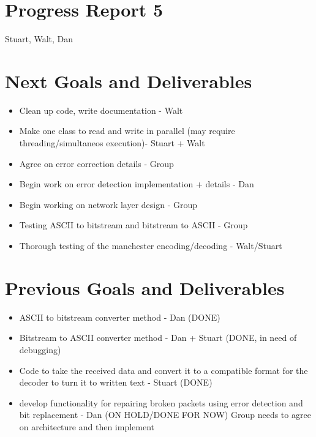 \documentclass{article}
\begin{document}
\section*{Progress Report 5}
Stuart, Walt, Dan

\section*{Next Goals and Deliverables}
\begin{itemize}
\item Clean up code, write documentation - Walt
\item Make one class to read and write in parallel (may require threading/simultaneos execution)- Stuart + Walt
\item Agree on error correction details - Group
\item Begin work on error detection implementation + details - Dan
\item Begin working on network layer design - Group
\item Testing ASCII to bitstream and bitstream to ASCII - Group
\item Thorough testing of the manchester encoding/decoding - Walt/Stuart
\end{itemize}

\section*{Previous Goals and Deliverables}
\begin{itemize}
    \item ASCII to bitstream converter method - Dan (DONE)
    \item Bitstream to ASCII converter method - Dan + Stuart (DONE, in need of debugging)
    \item Code to take the received data and convert it to a compatible format for the decoder to turn it to written text - Stuart (DONE)
    \item develop functionality for repairing broken packets using error detection and bit replacement - Dan (ON HOLD/DONE FOR NOW)
        \subitem Group needs to agree on architecture and then implement 
\end{itemize}
\end{document}
